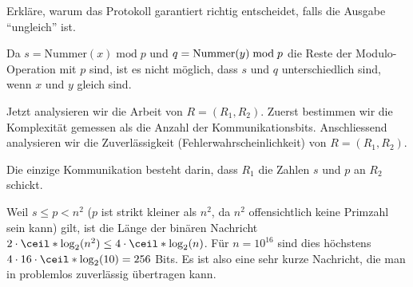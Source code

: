 \begin{Exercise}
Erkläre, warum das Protokoll garantiert richtig entscheidet, falls die Ausgabe ``ungleich'' ist.
\end{Exercise}

\begin{Answer}
Da $s = \text{Nummer}(x)\; \text{mod} \; p$ und $q = \text{Nummer}(y)\; \text{\text{mod}} \; p$ die Reste der Modulo-Operation mit $p$ sind, ist es nicht möglich, dass $s$ und $q$ unterschiedlich sind, wenn $x$ und $y$ gleich sind.
\end{Answer}

Jetzt analysieren wir die Arbeit von $R = (R_1,R_2)$. Zuerst bestimmen wir die Komplexität gemessen als die Anzahl der Kommunikationsbits. Anschliessend analysieren wir die Zuverlässigkeit (Fehlerwahrscheinlichkeit) von $R = (R_1,R_2)$.

Die einzige Kommunikation besteht darin, dass $R_1$ die Zahlen $s$ und $p$ an $R_2$ schickt.

Weil $s\leq p < n^2$ ($p$ ist strikt kleiner als $n^2$, da $n^2$ offensichtlich keine Primzahl sein kann) gilt, ist die Länge der binären Nachricht $2\cdot \ceil*{\log_2(n^2)}\leq 4\cdot \ceil*{\log_2(n)}$. Für $n = 10^{16}$ sind dies höchstens $4\cdot 16\cdot \ceil*{\log_2(10)}=256$ Bits. Es ist also eine sehr kurze Nachricht, die man in problemlos zuverlässig übertragen kann.

